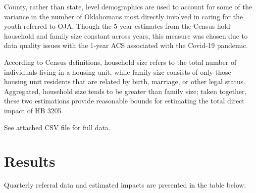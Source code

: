 \documentclass[
  letterpaper,
  DIV=11,
  numbers=noendperiod]{scrartcl}
\begin{document}
County, rather than state, level demographics are used to account for
some of the variance in the number of Oklahomans most directly involved
in caring for the youth referred to OJA. Though the 5-year estimates
from the Census hold household and family size constant across years,
this measure was chosen due to data quality issues with the 1-year ACS
associated with the Covid-19 pandemic.

According to Census definitions, household size refers to the total
number of individuals living in a housing unit, while family size
consists of only those housing unit residents that are related by birth,
marriage, or other legal status. Aggregated, household size tends to be
greater than family size; taken together, these two estimations provide
reasonable bounds for estimating the total direct impact of HB 3205.

See attached CSV file for full data.

\section{Results}\label{results}

Quarterly referral data and estimated impacts are presented in the table
below:
\end{document}
